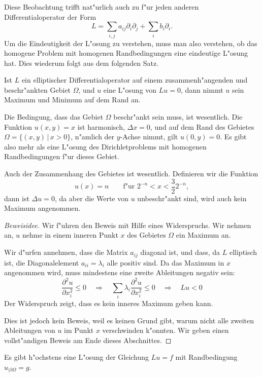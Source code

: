 Diese Beobachtung trifft nat"urlich auch zu f"ur jeden anderen
Differentialoperator der Form
\[
L=\sum_{i,j}a_{ij}\partial_i\partial_j+\sum_i b_i\partial_i.
\]
Um die Eindeutigkeit der L"osung zu verstehen, muss man also verstehen,
ob das homogene Problem mit homogenen Randbedingungen eine
eindeutige L"osung hat. Dies wiederum folgt aus dem folgenden Satz.

\begin{satz}
\label{maximumprinzip}
Ist $L$ ein elliptischer Differentialoperator auf einem zusammenh"angenden
und beschr"ankten Gebiet $\Omega$,
und $u$ eine L"osung von $Lu=0$,
dann nimmt $u$ sein Maximum und Minimum auf dem Rand an.
\end{satz}

Die Bedingung, dass das Gebiet $\Omega$ beschr"ankt sein muss, ist
wesentlich.
Die Funktion $u(x,y)=x$ ist harmonisch, $\Delta x=0$, und auf
dem Rand des Gebietes $\Omega=\{(x,y)\,|\,x>0\}$, n"amlich
der $y$-Achse nimmt, gilt $u(0,y)=0$.
Es gibt also mehr als eine L"osung des Dirichletproblems mit
homogenen Randbedingungen f"ur dieses Gebiet.

Auch der Zusammenhang des Gebietes ist wesentlich.  Definieren wir
die Funktion 
\[
u(x)=n\qquad\text{f"ur $2^{-n} < x < \frac{3}{2}2^{-n}$},
\]
dann ist $\Delta u=0$, da aber die Werte von $u$ unbeschr"ankt sind,
wird auch kein Maximum angenommen.

\begin{proof}[Beweisidee]
Wir f"uhren den Beweis mit Hilfe eines Widerspruchs. Wir nehmen
an, $u$ nehme in einem inneren Punkt $x$ des Gebietes $\Omega$ ein
Maximum an.

Wir d"urfen annehmen, dass die Matrix $a_{ij}$ diagonal ist,
und dass,
da $L$ elliptisch ist, die Diagonalelement $a_{ii}=\lambda_i$
alle positiv sind. Da das Maximum in $x$ angenommen wird, muss
mindestens eine zweite Ableitungen negativ sein:
\[
\frac{\partial^2u}{\partial x_i^2}
\le 0
\quad
\Rightarrow
\quad
\sum_{i}\lambda_i \frac{\partial^2u}{\partial x_i^2} \le 0
\quad
\Rightarrow
\quad
Lu<0
\]
Der Widerspruch zeigt, dass es kein inneres Maximum geben kann.

Dies ist jedoch kein Beweis, weil es keinen Grund gibt, warum
nicht alle zweiten Ableitungen von $u$ im Punkt $x$ verschwinden
k"onnten. Wir geben einen vollst"andigen Beweis am Ende dieses
Abschnittes.
\end{proof}

\begin{satz}
Es gibt h"ochstens eine L"osung der Gleichung
$Lu=f$ 
mit Randbedingung
$u_{|\partial\Omega}=g$.
\end{satz}

